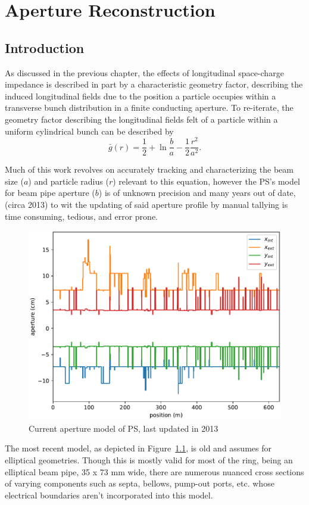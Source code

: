 \chapter{Aperture Reconstruction}

\section{Introduction}

As discussed in the previous chapter, the effects of longitudinal space-charge impedance is described in part by a characteristic geometry factor, describing the induced longitudinal fields due to the position a particle occupies within a transverse bunch distribution in a finite conducting aperture. To re-iterate, the geometry factor describing the longitudinal fields felt of a particle within a uniform cylindrical bunch can be described by
$$\bar{g}(r) = \frac{1}{2} + \ln\frac{b}{a}-\frac{1}{2}\frac{r^2}{a^2}.$$

Much of this work revolves on accurately tracking and characterizing the beam size ($a$) and particle radius ($r$) relevant to this equation, however the PS's model for beam pipe aperture ($b$) is of unknown precision and many years out of date, (circa 2013) to wit the updating of said aperture profile by manual tallying is time consuming, tedious, and error prone.
\begin{figure}
    \centering
    \includegraphics{figs/ps_aperture.pdf}
    \caption{Current aperture model of PS, last updated in 2013}
    \label{fig:ps_aperture_model}
\end{figure}
The most recent model, as depicted in Figure~\ref{fig:ps_aperture_model}, is old and assumes for elliptical geometries. Though this is mostly valid for most of the ring, being an elliptical beam pipe, 35 x 73 mm wide, there are numerous nuanced cross sections of varying components such as septa, bellows, pump-out ports, etc. whose electrical boundaries aren't incorporated into this model.

